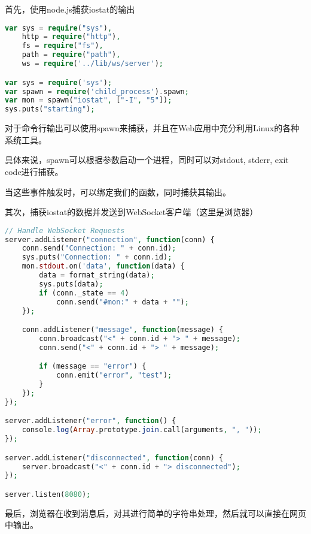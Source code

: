 \begin{compactitem}
\item 首先，使用node.js捕获iostat的输出

\begin{lstlisting}[language=PHP,basicstyle=\ttfamily\footnotesize]
var sys = require("sys"),
    http = require("http"),
    fs = require("fs"),
    path = require("path"),
    ws = require('../lib/ws/server');

var sys = require('sys');
var spawn = require('child_process').spawn;
var mon = spawn("iostat", ["-I", "5"]);
sys.puts("starting");
\end{lstlisting}

对于命令行输出可以使用spawn来捕获，并且在Web应用中充分利用Linux的各种系统工具。

具体来说，spawn可以根据参数启动一个进程，同时可以对stdout, stderr, exit code进行捕获。

当这些事件触发时，可以绑定我们的函数，同时捕获其输出。


\item 其次，捕获iostat的数据并发送到WebSocket客户端（这里是浏览器）

\begin{lstlisting}[language=PHP,basicstyle=\ttfamily\footnotesize]
// Handle WebSocket Requests
server.addListener("connection", function(conn) {
    conn.send("Connection: " + conn.id);
    sys.puts("Connection: " + conn.id);
    mon.stdout.on('data', function(data) {
        data = format_string(data);
        sys.puts(data);
        if (conn._state == 4)
            conn.send("#mon:" + data + "");
    });

    conn.addListener("message", function(message) {
        conn.broadcast("<" + conn.id + "> " + message);
        conn.send("<" + conn.id + "> " + message);

        if (message == "error") {
            conn.emit("error", "test");
        }
    });
});

server.addListener("error", function() {
    console.log(Array.prototype.join.call(arguments, ", "));
});

server.addListener("disconnected", function(conn) {
    server.broadcast("<" + conn.id + "> disconnected");
});

server.listen(8080);
\end{lstlisting}


\item 最后，浏览器在收到消息后，对其进行简单的字符串处理，然后就可以直接在网页中输出。


\end{compactitem}
